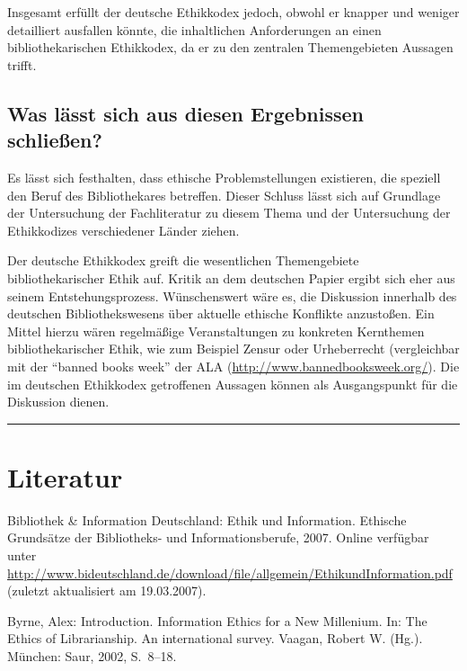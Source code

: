 \documentclass[output=paper]{langscibook}
\begin{document}
Insgesamt erfüllt der deutsche Ethikkodex jedoch, obwohl er knapper und
weniger detailliert ausfallen könnte, die inhaltlichen Anforderungen an
einen bibliothekarischen Ethikkodex, da er zu den zentralen
Themengebieten Aussagen trifft.

\hypertarget{was-luxe4sst-sich-aus-diesen-ergebnissen-schlieuxdfen}{%
\subsection*{Was lässt sich aus diesen Ergebnissen
schließen?}\label{was-luxe4sst-sich-aus-diesen-ergebnissen-schlieuxdfen}}

Es lässt sich festhalten, dass ethische Problemstellungen existieren,
die speziell den Beruf des Bibliothekares betreffen. Dieser Schluss
lässt sich auf Grundlage der Untersuchung der Fachliteratur zu diesem
Thema und der Untersuchung der Ethikkodizes verschiedener Länder ziehen.

Der deutsche Ethikkodex greift die wesentlichen Themengebiete
bibliothekarischer Ethik auf. Kritik an dem deutschen Papier ergibt sich
eher aus seinem Entstehungsprozess. Wünschenswert wäre es, die
Diskussion innerhalb des deutschen Bibliothekswesens über aktuelle
ethische Konflikte anzustoßen. Ein Mittel hierzu wären regelmäßige
Veranstaltungen zu konkreten Kernthemen bibliothekarischer Ethik, wie
zum Beispiel Zensur oder Urheberrecht (vergleichbar mit der
\enquote{banned books week} der ALA
(\url{http://www.bannedbooksweek.org/}). Die im deutschen Ethikkodex
getroffenen Aussagen können als Ausgangspunkt für die Diskussion dienen.

\begin{center}\rule{0.5\linewidth}{0.5pt}\end{center}

\hypertarget{literatur}{%
\section*{Literatur}\label{literatur}}

Bibliothek \& Information Deutschland: Ethik und Information. Ethische
Grundsätze der Bibliotheks- und Informationsberufe, 2007. Online
verfügbar unter
\url{http://www.bideutschland.de/download/file/allgemein/EthikundInformation.pdf}
(zuletzt aktualisiert am 19.03.2007).

Byrne, Alex: Introduction. Information Ethics for a New Millenium. In:
The Ethics of Librarianship. An international survey. Vaagan, Robert W.
(Hg.). München: Saur, 2002, S.~8--18.
\end{document}
